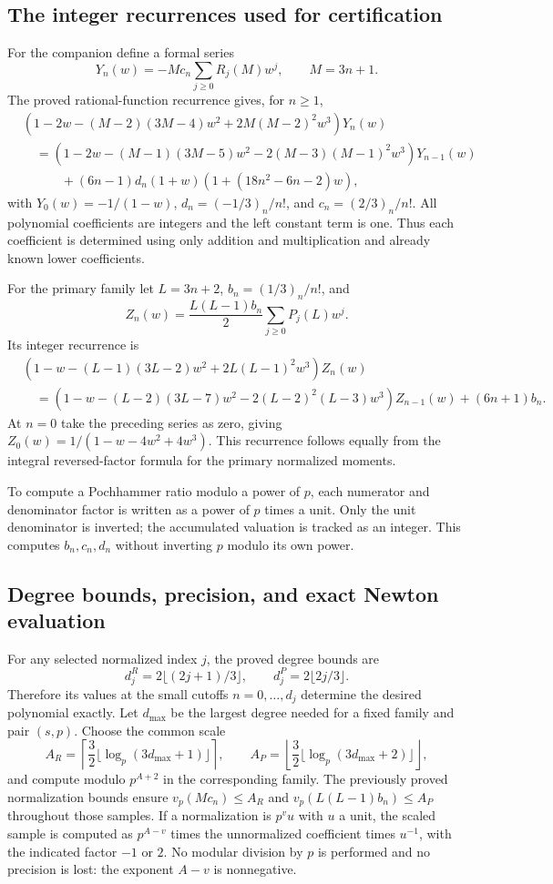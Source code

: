\documentclass[11pt,letterpaper]{article}
\numberwithin{equation}{section}
\begin{document}
\subsection{The integer recurrences used for certification}
For the companion define a formal series
\[
 Y_n(w)=-M c_n\sum_{j\ge0}R_j(M)w^j,\qquad M=3n+1.
\]
The proved rational-function recurrence gives, for $n\ge1$,
\begin{align*}
 &(1-2w-(M-2)(3M-4)w^2+2M(M-2)^2w^3)Y_n(w)\\
 &\quad=(1-2w-(M-1)(3M-5)w^2
            -2(M-3)(M-1)^2w^3)Y_{n-1}(w)\\
 &\qquad\quad +(6n-1)d_n(1+w)(1+(18n^2-6n-2)w),
\end{align*}
with $Y_0(w)=-1/(1-w)$, $d_n=(-1/3)_n/n!$, and $c_n=(2/3)_n/n!$.
All polynomial coefficients are integers and the left constant term
is one. Thus each coefficient is determined using only addition and
multiplication and already known lower coefficients.

For the primary family let $L=3n+2$, $b_n=(1/3)_n/n!$, and
\[
 Z_n(w)=\frac{L(L-1)b_n}{2}\sum_{j\ge0}P_j(L)w^j.
\]
Its integer recurrence is
\begin{align*}
 &(1-w-(L-1)(3L-2)w^2+2L(L-1)^2w^3)Z_n(w)\\
 &\quad=(1-w-(L-2)(3L-7)w^2
            -2(L-2)^2(L-3)w^3)Z_{n-1}(w)+(6n+1)b_n.
\end{align*}
At $n=0$ take the preceding series as zero, giving
$Z_0(w)=1/(1-w-4w^2+4w^3)$.
This recurrence follows equally from the integral reversed-factor
formula for the primary normalized moments.

To compute a Pochhammer ratio modulo a power of $p$, each numerator
and denominator factor is written as a power of $p$ times a unit.
Only the unit denominator is inverted; the accumulated valuation is
tracked as an integer. This computes $b_n,c_n,d_n$ without inverting
$p$ modulo its own power.

\subsection{Degree bounds, precision, and exact Newton evaluation}
For any selected normalized index $j$, the proved degree bounds are
\[
 d_j^R=2\lfloor(2j+1)/3\rfloor,\qquad
 d_j^P=2\lfloor2j/3\rfloor.
\]
Therefore its values at the small cutoffs $n=0,\ldots,d_j$ determine
the desired polynomial exactly. Let $d_{\max}$ be the largest degree
needed for a fixed family and pair $(s,p)$. Choose the common scale
\[
 A_R=\left\lceil\frac32\lfloor\log_p(3d_{\max}+1)\rfloor\right\rceil,
 \qquad
 A_P=\left\lfloor\frac32\lfloor\log_p(3d_{\max}+2)\rfloor\right\rfloor,
\]
and compute modulo $p^{A+2}$ in the corresponding family.
The previously proved normalization bounds ensure
$v_p(Mc_n)\le A_R$ and $v_p(L(L-1)b_n)\le A_P$ throughout those samples.
If a normalization is $p^vu$ with $u$ a unit, the scaled sample is
computed as $p^{A-v}$ times the unnormalized coefficient times $u^{-1}$,
with the indicated factor $-1$ or $2$. No modular division by $p$ is
performed and no precision is lost: the exponent $A-v$ is nonnegative.
\end{document}
